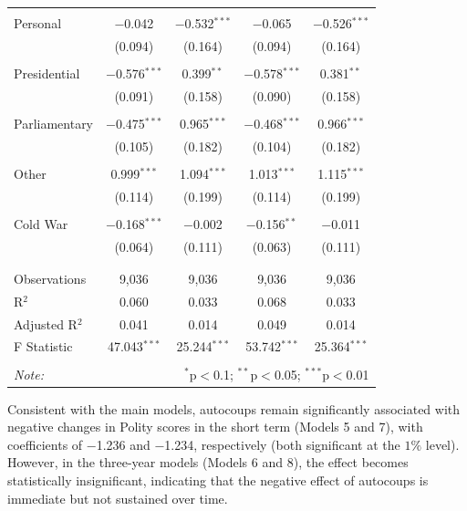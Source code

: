 \documentclass[
  12pt,
]{report}
\begin{document}
\begin{table}
{\begin{tabular}{@{\extracolsep{20pt}}lcccc}
  & & & & \\ 
 \hspace{1.5cm} Personal & $-$0.042 & $-$0.532$^{***}$ & $-$0.065 & $-$0.526$^{***}$ \\ 
  & (0.094) & (0.164) & (0.094) & (0.164) \\ 
  & & & & \\ 
 \hspace{1.5cm} Presidential & $-$0.576$^{***}$ & 0.399$^{**}$ & $-$0.578$^{***}$ & 0.381$^{**}$ \\ 
  & (0.091) & (0.158) & (0.090) & (0.158) \\ 
  & & & & \\ 
 \hspace{1.5cm} Parliamentary & $-$0.475$^{***}$ & 0.965$^{***}$ & $-$0.468$^{***}$ & 0.966$^{***}$ \\ 
  & (0.105) & (0.182) & (0.104) & (0.182) \\ 
  & & & & \\ 
 \hspace{1.5cm} Other & 0.999$^{***}$ & 1.094$^{***}$ & 1.013$^{***}$ & 1.115$^{***}$ \\ 
  & (0.114) & (0.199) & (0.114) & (0.199) \\ 
  & & & & \\ 
 Cold War & $-$0.168$^{***}$ & $-$0.002 & $-$0.156$^{**}$ & $-$0.011 \\ 
  & (0.064) & (0.111) & (0.063) & (0.111) \\ 
  & & & & \\ 
\hline \\[-1.8ex] 
Observations & 9,036 & 9,036 & 9,036 & 9,036 \\ 
R$^{2}$ & 0.060 & 0.033 & 0.068 & 0.033 \\ 
Adjusted R$^{2}$ & 0.041 & 0.014 & 0.049 & 0.014 \\ 
F Statistic & 47.043$^{***}$ & 25.244$^{***}$ & 53.742$^{***}$ & 25.364$^{***}$ \\ 
\hline 
\hline \\[-1.8ex] 
\textit{Note:}  & \multicolumn{4}{r}{$^{*}$p$<$0.1; $^{**}$p$<$0.05; $^{***}$p$<$0.01} \\ 
\end{tabular}

}

\end{table}%

Consistent with the main models, autocoups remain significantly
associated with negative changes in Polity scores in the short term
(Models 5 and 7), with coefficients of −1.236 and −1.234, respectively
(both significant at the \(1\%\) level). However, in the three-year
models (Models 6 and 8), the effect becomes statistically insignificant,
indicating that the negative effect of autocoups is immediate but not
sustained over time.
\end{document}
